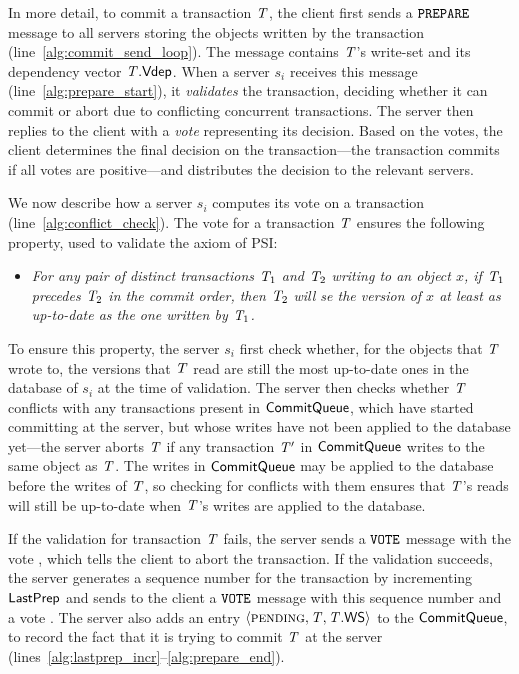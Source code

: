In more detail, to commit a transaction $\mathit{T}$, the client first sends a ${\tt PREPARE}$ message to all servers storing the objects written by the transaction (line~\ref{alg:commit_send_loop}). The message contains $\mathit{T}$'s write-set and its dependency vector $\mathit{T}.\mathsf{Vdep}$. When a server $s_i$ receives this message (line~\ref{alg:prepare_start}), it \emph{validates} the transaction, deciding whether it can commit or abort due to conflicting concurrent transactions. The server then replies to the client with a \emph{vote} representing its decision. Based on the votes, the client determines the final decision on the transaction---the transaction commits if all votes are positive---and distributes the decision to the relevant servers.

We now describe how a server $s_i$ computes its vote on a transaction (line~\ref{alg:conflict_check}). The vote for a transaction $\mathit{T}$ ensures the following property, used to validate the \Wconflict axiom of PSI: 

\begin{itemize}
    \item \emph{For any pair of distinct transactions $\mathit{T}_1$ and $\mathit{T}_2$ writing to an object $x$, if $\mathit{T}_1$ precedes $\mathit{T}_2$ in the commit order, then $\mathit{T}_2$ will se the version of $x$ at least as up-to-date as the one written by $\mathit{T}_1$.}
\end{itemize}

To ensure this property, the server $s_i$ first check whether, for the objects that $\mathit{T}$ wrote to, the versions that $\mathit{T}$ read are still the most up-to-date ones in the database of $s_i$ at the time of validation. The server then checks whether $\mathit{T}$ conflicts with any transactions present in $\mathsf{CommitQueue}$, which have started committing at the server, but whose writes have not been applied to the database yet---the server aborts $\mathit{T}$ if any transaction $\mathit{T}'$ in $\mathsf{CommitQueue}$ writes to the same object as $\mathit{T}$. The writes in $\mathsf{CommitQueue}$ may be applied to the database before the writes of $\mathit{T}$, so checking for conflicts with them ensures that $\mathit{T}$'s reads will still be up-to-date when $\mathit{T}$'s writes are applied to the database.

If the validation for transaction $\mathit{T}$ fails, the server sends a ${\tt VOTE}$ message with the vote \abort, which tells the client to abort the transaction. If the validation succeeds, the server generates a sequence number for the transaction by incrementing $\mathsf{LastPrep}$ and sends to the client a ${\tt VOTE}$ message with this sequence number and a vote \commit. The server also adds an entry $\langle \text{\sc pending}, \mathit{T}, \mathit{T}.\mathsf{WS} \rangle$ to the $\mathsf{CommitQueue}$, to record the fact that it is trying to commit $\mathit{T}$ at the server (lines~\ref{alg:lastprep_incr}--\ref{alg:prepare_end}).

